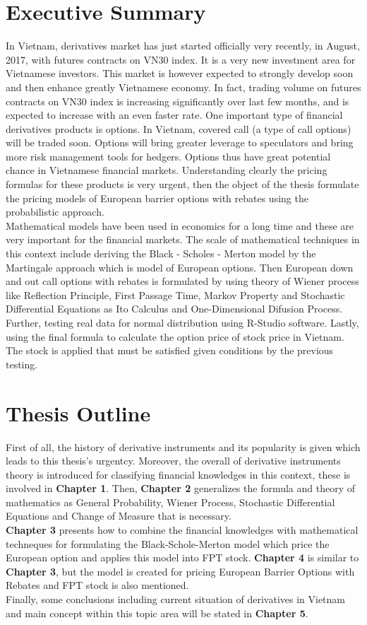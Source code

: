\documentclass[12pt,a4paper,left=2cm,right=2cm,oneside,titlepage]{report}
\numberwithin{equation}{section}
\begin{document}
	\chapter*{Executive Summary}
	
	\fontsize{11pt}{20pt}\selectfont In Vietnam, derivatives market has just started officially very recently, in August, 2017, with
	futures contracts on VN30 index. It is a very new investment area for Vietnamese investors.
	This market is however expected to strongly develop soon and then enhance greatly Vietnamese
	economy. In fact, trading volume on futures contracts on VN30 index is increasing significantly over last few months, and is expected to increase with an even faster rate. One important type of financial derivatives products is options. In Vietnam, covered call (a type of call options)
	will be traded soon. Options will bring greater leverage to speculators and bring more risk management tools for hedgers. Options thus have great potential chance in Vietnamese financial markets. Understanding clearly the pricing formulas for these products is very urgent, then the
	object of the thesis formulate the pricing models of European barrier options with rebates using
	the probabilistic approach.\\[0.5cm]
	Mathematical models have been used in economics for a long time and these are very important for the financial markets. The scale of mathematical techniques in this context include deriving the Black - Scholes - Merton model by the Martingale approach which is model of European options. Then European down and out call options with rebates is formulated by using theory of Wiener process like Reflection Principle, First Passage Time, Markov Property and Stochastic Differential Equations as Ito Calculus and One-Dimensional Difusion Process. Further, testing real data for normal distribution using R-Studio software. Lastly, using the final formula to calculate the option price of stock price in Vietnam. The stock is applied that must be satisfied given conditions by the previous testing.	
	\chapter*{Thesis Outline}
	First of all, the history of derivative instruments and its popularity is given which leads to this thesis's urgentcy. Moreover, the overall of derivative instruments theory is introduced for classifying financial knowledges in this context, these is involved in \textbf{Chapter 1}.  Then, \textbf{Chapter 2} generalizes the formula and theory of mathematics as General Probability, Wiener Process, Stochastic Differential Equations and Change of Measure that is necessary.  \\[0.5cm]
	\textbf{Chapter 3} presents how to combine the financial knowledges with mathematical techneques for formulating the Black-Schole-Merton model which price the European option and applies this model into FPT stock. 	\textbf{Chapter 4} is similar to \textbf{Chapter 3}, but the model is created for pricing European Barrier Options with
	Rebates and FPT stock is also mentioned. \\[0.5cm]
	Finally, some conclusions including current situation of derivatives in Vietnam and main concept within this topic
	area will be stated in \textbf{Chapter 5}.
\end{document}
